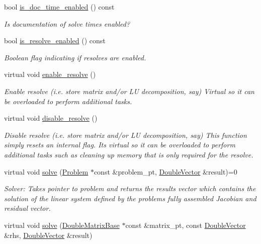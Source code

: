 \begin{DoxyCompactItemize}
bool \hyperlink{classoomph_1_1LinearSolver_a451ce3af5db82f9edbddf8f417597248}{is\+\_\+doc\+\_\+time\+\_\+enabled} () const
\begin{DoxyCompactList}\small\item\em Is documentation of solve times enabled? \end{DoxyCompactList}\item 
bool \hyperlink{classoomph_1_1LinearSolver_ae1e4d34a7e2b1537d36153f87e8a62a6}{is\+\_\+resolve\+\_\+enabled} () const
\begin{DoxyCompactList}\small\item\em Boolean flag indicating if resolves are enabled. \end{DoxyCompactList}\item 
virtual void \hyperlink{classoomph_1_1LinearSolver_a3000ebd9becb3468d8a6a821a9cc0cd9}{enable\+\_\+resolve} ()
\begin{DoxyCompactList}\small\item\em Enable resolve (i.\+e. store matrix and/or LU decomposition, say) Virtual so it can be overloaded to perform additional tasks. \end{DoxyCompactList}\item 
virtual void \hyperlink{classoomph_1_1LinearSolver_ad61c63af94c5961830bd9807225a48d6}{disable\+\_\+resolve} ()
\begin{DoxyCompactList}\small\item\em Disable resolve (i.\+e. store matrix and/or LU decomposition, say) This function simply resets an internal flag. It\textquotesingle{}s virtual so it can be overloaded to perform additional tasks such as cleaning up memory that is only required for the resolve. \end{DoxyCompactList}\item 
virtual void \hyperlink{classoomph_1_1LinearSolver_a15ce22542b74ed1826ea485edacbeb6e}{solve} (\hyperlink{classoomph_1_1Problem}{Problem} $\ast$const \&problem\+\_\+pt, \hyperlink{classoomph_1_1DoubleVector}{Double\+Vector} \&result)=0
\begin{DoxyCompactList}\small\item\em Solver\+: Takes pointer to problem and returns the results vector which contains the solution of the linear system defined by the problem\textquotesingle{}s fully assembled Jacobian and residual vector. \end{DoxyCompactList}\item 
virtual void \hyperlink{classoomph_1_1LinearSolver_a546c09822d18191df14caed864c04c09}{solve} (\hyperlink{classoomph_1_1DoubleMatrixBase}{Double\+Matrix\+Base} $\ast$const \&matrix\+\_\+pt, const \hyperlink{classoomph_1_1DoubleVector}{Double\+Vector} \&rhs, \hyperlink{classoomph_1_1DoubleVector}{Double\+Vector} \&result)

\end{DoxyCompactItemize}
